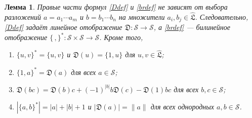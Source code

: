 \documentclass[11pt,reqno]{amsart}
\newcommand{\LL}{\mathfrak L}
\newcommand{\D}{\mathfrak D}
\newcommand{\Sm}{\mathcal S}
\newcommand{\Lh}{\widehat{\LL}}
\newcommand{\rp}[1]{\|#1\|}
\theoremstyle{plain}
\newtheorem{lemma}[theorem]{Лемма}
\theoremstyle{definition}
\theoremstyle{remark}
\begin{document}
\begin{lemma}\label{lem:welldef}
Правые части формул \eqref{Ddef} и \eqref{brdef} не зависят от выбора разложений $a=a_1\cdots a_m$ и $b=b_1\cdots b_n$ на множители $a_i,b_j\in\Lh$.
Следовательно, \eqref{Ddef} задаёт линейное отображение $\D\colon\Sm\to\Sm$, а \eqref{brdef} --- билинейное отображение $\{\,,\}^*\colon\Sm\times\Sm\to\Sm$.
Кроме того,
\begin{enumerate}
\item[(i)] $\{u,v\}^*=\{u,v\}$ и $\D(u)=\{1,u\}$ для $u,v\in\Lh$;
\item[(ii)] $\{1,a\}^*=\D(a)$ для всех $a\in\Sm$;
\item[(iii)] $\D(bc)=\D(b)c+(-1)^{|b|}b\D(c)-\D(1)bc$ для всех $b,c\in\Sm$;
\item[(iv)] $|\{a,b\}^*|=|a|+|b|+1$ и $|\D(a)|=\rp a$ для всех однородных $a,b\in\Sm$.
\end{enumerate}
\end{lemma}
\end{document}
